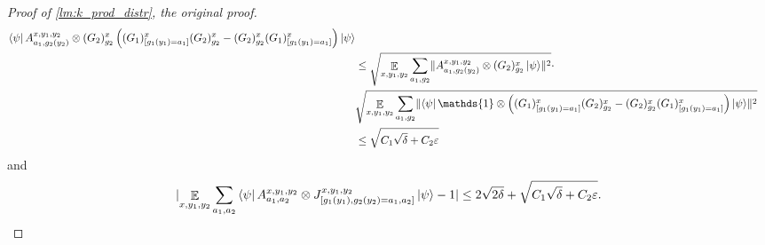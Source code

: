\documentclass[11pt]{article}
\theoremstyle{plain}
\theoremstyle{definition}
\DeclarePairedDelimiter{\norm}{\lVert}{\rVert}
\DeclarePairedDelimiter{\abs}{\lvert}{\rvert}
\newcommand {\bra} [1] {\ensuremath{ \left\langle #1 \right| }}
\newcommand {\ket} [1] {\ensuremath{ \left| #1 \right\rangle }}
\DeclareMathOperator*{\bigE}{\mathbb{E}}
\newcommand {\id} {\ensuremath{\mathds{1}}}
\newcommand{\ep} {\ensuremath{\varepsilon}}
\newcommand{\x}{\otimes}
\newcommand{\1}{\mathbb{1}} %
\begin{document}
\begin{proof}[Proof of \cref{lm:k_prod_distr}, the original proof]
\begin{align*}
{		\bra{\psi} A^{x,y_1,y_2}_{a_1,g_2(y_2) } \x 
		(G_2)^x_{g_2}  \left(  (G_1)^x_{[g_1(y_1) = a_1]}(G_2)^x_{g_2} - (G_2)^x_{g_2}(G_1)^x_{[g_1(y_1) = a_1]} \right)  \ket{\psi} } \\
	& \leq \sqrt{  \bigE_{x,y_1,y_2} \sum_{a_1, g_2} \norm{  A^{x,y_1,y_2}_{a_1,g_2(y_2) } \x 
		(G_2)^x_{g_2} \ket{\psi}}^2} \cdot \\
		&\sqrt{ \bigE_{x,y_1,y_2} \sum_{a_1, g_2} \norm{ \bra{\psi} \id\x \left(  (G_1)^x_{[g_1(y_1) = a_1]}(G_2)^x_{g_2} - (G_2)^x_{g_2}(G_1)^x_{[g_1(y_1) = a_1]} \right)  \ket{\psi}}^2} \\
		&\leq \sqrt{ C_1 \sqrt{\delta} + C_2\ep}
	\end{align*}
	and
	\begin{align*}
		\abs{	\bigE_{x,y_1,y_2} \sum_{a_1, a_2} \bra{\psi} A^{x,y_1,y_2}_{a_1,a_2} \x J^{x,y_1,y_2}_{[g_1(y_1),g_2(y_2) = a_1, a_2]} \ket{\psi}-1}
		\leq 2\sqrt{2\delta} + \sqrt{ C_1 \sqrt{\delta} + C_2\ep}.
	\end{align*}
	

\end{proof}
\end{document}
